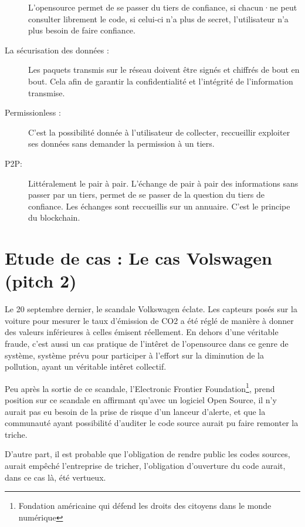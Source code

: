 \documentclass[a4paper,12pt]{article}
\begin{document}
\begin{description}
L'opensource permet de se passer du tiers de confiance, si chacun·ne peut consulter librement le code, si celui-ci n'a plus de secret, l'utilisateur n'a plus besoin de faire confiance.  
		\item [La sécurisation des données : ] Les paquets transmis sur le réseau doivent être signés et chiffrés de bout en bout. Cela afin de garantir la confidentialité et l'intégrité de l'information transmise. 
		\item [Permissionless : ] C'est la possibilité donnée à l'utilisateur de collecter, reccueillir exploiter ses données sans demander la permission à un tiers. 
		\item [P2P: ] Littéralement le pair à pair. L'échange de pair à pair des informations sans passer par un tiers, permet de se passer de la question du tiers de confiance. Les échanges sont reccueillis sur un annuaire. C'est le principe du blockchain.
	\end{description}

\section{Etude de cas : Le cas Volswagen (pitch 2)}
Le 20 septembre dernier, le scandale Volkswagen éclate. Les capteurs posés sur la voiture pour mesurer le taux d'émission de CO2 a été réglé de manière à donner des valeurs inférieures à celles émisent réellement. En dehors d'une véritable fraude, c'est aussi un cas pratique de l'intêret de l'opensource dans ce genre de système, système prévu pour participer à l'effort sur la diminution de la pollution, ayant un véritable intêret collectif. 

Peu après la sortie de ce scandale, l'Electronic Frontier Foundation\footnote{Fondation américaine qui défend les droits des citoyens dans le monde numérique}, prend position sur ce scandale en affirmant qu'avec un logiciel Open Source, il n'y aurait pas eu besoin de la prise de risque d'un lanceur d'alerte, et que la communauté ayant possibilité d'auditer le code source aurait pu faire remonter la triche.

D'autre part, il est probable que l'obligation de rendre public les codes sources, aurait empêché l'entreprise de tricher, l'obligation d'ouverture du code aurait, dans ce cas là, été vertueux. 
\end{document}
